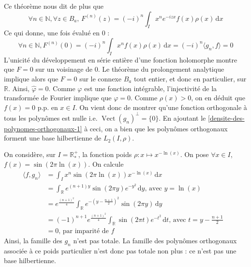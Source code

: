 \begin{demonstration}
		Ce théorème nous dit de plus que
		\[ \forall n \in \mathbb{N}, \forall z \in B_a, \, F^{(n)}(z) = (-i)^n \int_I x^n e^{-izx} f(x) \rho(x) \, \mathrm{d}x \]
		Ce qui donne, une fois évalué en $0$ :
		\[ \forall n \in \mathbb{N}, F^{(n)}(0) = (-i)^n \int_I x^n f(x) \rho(x) \, \mathrm{d}x = (-i)^n \langle g_n, f \rangle = 0 \]
		L'unicité du développement en série entière d'une fonction holomorphe montre que $F = 0$ sur un voisinage de $0$. Le théorème du prolongement analytique implique alors que $F = 0$ sur le connexe $B_a$ tout entier, et donc en particulier, sur $\mathbb{R}$. Ainsi, $\hat{\varphi} = 0$. Comme $\varphi$ est une fonction intégrable, l'injectivité de la transformée de Fourier implique que $\varphi = 0$. Comme $\rho(x) > 0$, on en déduit que $f(x) = 0$ p.p. en $x \in I$. On vient donc de montrer qu'une fonction orthogonale à tous les polynômes est nulle i.e. $\operatorname{Vect}(g_n)^\perp = \{ 0 \}$.
		En ajoutant le \cref{densite-des-polynomes-orthogonaux-1} à ceci, on a bien que les polynômes orthogonaux forment une base hilbertienne de $L_2(I, \rho)$.
	\end{demonstration}
	
	\begin{cexample}
		On considère, sur $I = \mathbb{R}^+_*$, la fonction poids $\rho : x \mapsto x^{-\ln(x)}$. On pose $\forall x \in I$, $f(x) = \sin(2 \pi \ln(x))$. On calcule
		\begin{align*}
			\langle f, g_n \rangle & = \int_I x^n \sin(2\pi \ln(x)) x^{-\ln(x)} \, \mathrm{d}x                                                     &   \\
			&= \int_\mathbb{R} e^{(n+1)y} \sin(2 \pi y) e^{-y^2} \, \mathrm{d}y \text{, avec } y = \ln(x) \\
			& = e^{\frac{(n+1)^2}{4}} \int_\mathbb{R} e^{- \left (y - \frac{n+1}{2} \right)^2} \sin(2 \pi y) \, \mathrm{d}y &   \\
			&= (-1)^{n+1} e^{\frac{(n+1)^2}{4}} \int_\mathbb{R} \sin(2 \pi t) e^{-t^2} \, \mathrm{d}t \text{, avec } t = y - \frac{n+1}{2} \\
			&= 0 \text{, par imparité de } f
		\end{align*}
		Ainsi, la famille des $g_n$ n'est pas totale. La famille des polynômes orthogonaux associée à ce poids particulier n'est donc pas totale non plus : ce n'est pas une base hilbertienne.
	\end{cexample}
